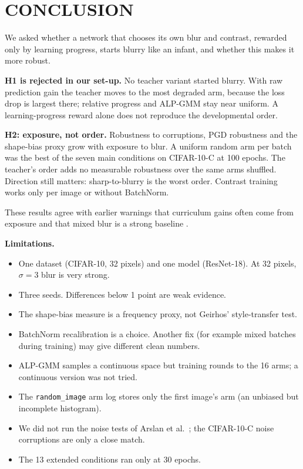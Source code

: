\documentclass[a4paper,12pt]{report}
\newcommand{\cond}[1]{\texttt{#1}}
\begin{document}
\chapter{CONCLUSION}

We asked whether a network that chooses its own blur and contrast, rewarded only by learning progress, starts blurry like an infant, and whether this makes it more robust.

\textbf{H1 is rejected in our set-up.} No teacher variant started blurry. With raw prediction gain the teacher moves to the most degraded arm, because the loss drop is largest there; relative progress and ALP-GMM stay near uniform. A learning-progress reward alone does not reproduce the developmental order.

\textbf{H2: exposure, not order.} Robustness to corruptions, PGD robustness and the shape-bias proxy grow with exposure to blur. A uniform random arm per batch was the best of the seven main conditions on CIFAR-10-C at 100 epochs. The teacher's order adds no measurable robustness over the same arms shuffled. Direction still matters: sharp-to-blurry is the worst order. Contrast training works only per image or without BatchNorm.

These results agree with earlier warnings that curriculum gains often come from exposure \cite{wu2021curricula,katzhendler2019} and that mixed blur is a strong baseline \cite{jang2024blur}.

\textbf{Limitations.}
\begin{itemize}
\item One dataset (CIFAR-10, 32 pixels) and one model (ResNet-18). At 32 pixels, $\sigma=3$ blur is very strong.
\item Three seeds. Differences below 1 point are weak evidence.
\item The shape-bias measure is a frequency proxy, not Geirhos' style-transfer test.
\item BatchNorm recalibration is a choice. Another fix (for example mixed batches during training) may give different clean numbers.
\item ALP-GMM samples a continuous space but training rounds to the 16 arms; a continuous version was not tried.
\item The \cond{random\_image} arm log stores only the first image's arm (an unbiased but incomplete histogram).
\item We did not run the noise tests of Arslan et al.\ \cite{arslan2024noise}; the CIFAR-10-C noise corruptions are only a close match.
\item The 13 extended conditions ran only at 30 epochs.
\end{itemize}
\end{document}
